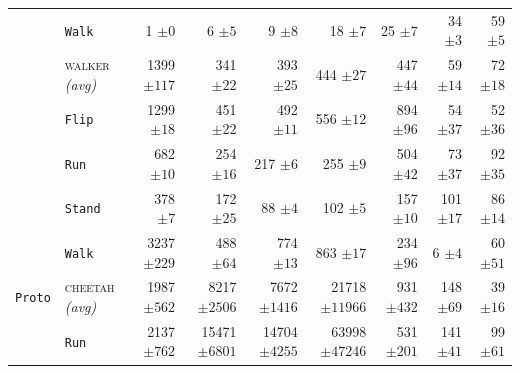 \documentclass{article}
\theoremstyle{plain}
\theoremstyle{definition}
\theoremstyle{remark}
\newcommand{\domainavg}[1]{\textsc{#1} \textit{(avg)}}
\begin{document}
\begin{table}[H]
\begin{tabular}{l l r r r r r r r}
& \hspace{.5em} \texttt{Walk} & 1 ${\scriptstyle \pm 0}$ & 6 ${\scriptstyle \pm 5}$ & 9 ${\scriptstyle \pm 8}$ & 18 ${\scriptstyle \pm 7}$ & 25 ${\scriptstyle \pm 7}$ & 34 ${\scriptstyle \pm 3}$ & 59 ${\scriptstyle \pm 5}$ \\
\addlinespace
 \rowcolor{gray!15}  \cellcolor{white} & \domainavg{walker} & 1399 ${\scriptstyle \pm 117}$ & 341 ${\scriptstyle \pm 22}$ & 393 ${\scriptstyle \pm 25}$ & 444 ${\scriptstyle \pm 27}$ & 447 ${\scriptstyle \pm 44}$ & 59 ${\scriptstyle \pm 14}$ & 72 ${\scriptstyle \pm 18}$ \\
& \hspace{.5em} \texttt{Flip} & 1299 ${\scriptstyle \pm 18}$ & 451 ${\scriptstyle \pm 22}$ & 492 ${\scriptstyle \pm 11}$ & 556 ${\scriptstyle \pm 12}$ & 894 ${\scriptstyle \pm 96}$ & 54 ${\scriptstyle \pm 37}$ & 52 ${\scriptstyle \pm 36}$ \\
& \hspace{.5em} \texttt{Run} & 682 ${\scriptstyle \pm 10}$ & 254 ${\scriptstyle \pm 16}$ & 217 ${\scriptstyle \pm 6}$ & 255 ${\scriptstyle \pm 9}$ & 504 ${\scriptstyle \pm 42}$ & 73 ${\scriptstyle \pm 37}$ & 92 ${\scriptstyle \pm 35}$ \\
& \hspace{.5em} \texttt{Stand} & 378 ${\scriptstyle \pm 7}$ & 172 ${\scriptstyle \pm 25}$ & 88 ${\scriptstyle \pm 4}$ & 102 ${\scriptstyle \pm 5}$ & 157 ${\scriptstyle \pm 10}$ & 101 ${\scriptstyle \pm 17}$ & 86 ${\scriptstyle \pm 14}$ \\
& \hspace{.5em} \texttt{Walk} & 3237 ${\scriptstyle \pm 229}$ & 488 ${\scriptstyle \pm 64}$ & 774 ${\scriptstyle \pm 13}$ & 863 ${\scriptstyle \pm 17}$ & 234 ${\scriptstyle \pm 96}$ & 6 ${\scriptstyle \pm 4}$ & 60 ${\scriptstyle \pm 51}$ \\
\addlinespace
\midrule
 \rowcolor{gray!15}  \cellcolor{white} \texttt{Proto} & \domainavg{cheetah} & 1987 ${\scriptstyle \pm 562}$ & 8217 ${\scriptstyle \pm 2506}$ & 7672 ${\scriptstyle \pm 1416}$ & 21718 ${\scriptstyle \pm 11966}$ & 931 ${\scriptstyle \pm 432}$ & 148 ${\scriptstyle \pm 69}$ & 39 ${\scriptstyle \pm 16}$ \\
& \hspace{.5em} \texttt{Run} & 2137 ${\scriptstyle \pm 762}$ & 15471 ${\scriptstyle \pm 6801}$ & 14704 ${\scriptstyle \pm 4255}$ & 63998 ${\scriptstyle \pm 47246}$ & 531 ${\scriptstyle \pm 201}$ & 141 ${\scriptstyle \pm 41}$ & 99 ${\scriptstyle \pm 61}$ \\

\end{tabular}
\end{table}
\end{document}
